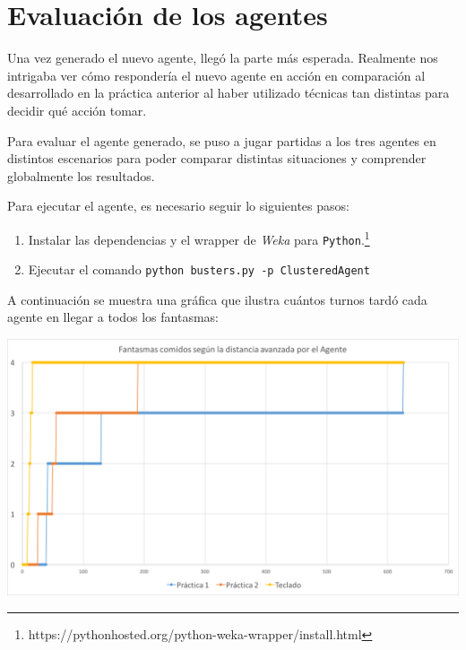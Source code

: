 \documentclass[12pt]{article}
\begin{document}
\newpage
\section{Evaluación de los agentes}


Una vez generado el nuevo agente, llegó la parte más esperada. Realmente nos intrigaba ver cómo respondería el nuevo agente en acción en comparación al desarrollado en la práctica anterior al haber utilizado técnicas tan distintas para decidir qué acción tomar.


Para evaluar el agente generado, se puso a jugar partidas a los tres agentes en distintos escenarios para poder comparar distintas situaciones y comprender globalmente los resultados.

Para ejecutar el agente, es necesario seguir lo siguientes pasos:
\begin{enumerate}
    \item Instalar las dependencias y el wrapper de \textit{Weka} para \texttt{Python}.\footnote{https://pythonhosted.org/python-weka-wrapper/install.html}
    \item Ejecutar el comando \texttt{python busters.py -p ClusteredAgent}
\end{enumerate}

A continuación se muestra una gráfica que ilustra cuántos turnos tardó cada agente en llegar a todos los fantasmas:

\begin{center}
    \includegraphics[width=15cm]{classicPerformanceComparison}
\end{center}
\end{document}
